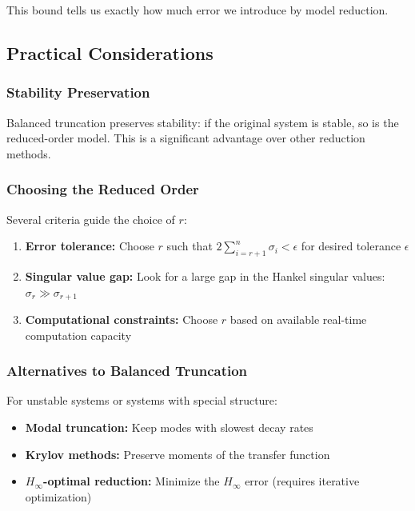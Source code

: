 This bound tells us exactly how much error we introduce by model reduction.


\subsection{Practical Considerations}

\subsubsection{Stability Preservation}

Balanced truncation preserves stability: if the original system is stable, so is the reduced-order model. This is a significant advantage over other reduction methods.

\subsubsection{Choosing the Reduced Order}

Several criteria guide the choice of $r$:
\begin{enumerate}
\item \textbf{Error tolerance:} Choose $r$ such that $2\sum_{i=r+1}^{n}\sigma_i < \epsilon$ for desired tolerance $\epsilon$
\item \textbf{Singular value gap:} Look for a large gap in the Hankel singular values: $\sigma_r \gg \sigma_{r+1}$
\item \textbf{Computational constraints:} Choose $r$ based on available real-time computation capacity
\end{enumerate}

\subsubsection{Alternatives to Balanced Truncation}

For unstable systems or systems with special structure:
\begin{itemize}
\item \textbf{Modal truncation:} Keep modes with slowest decay rates
\item \textbf{Krylov methods:} Preserve moments of the transfer function
\item \textbf{$H_\infty$-optimal reduction:} Minimize the $H_\infty$ error (requires iterative optimization)
\end{itemize}

